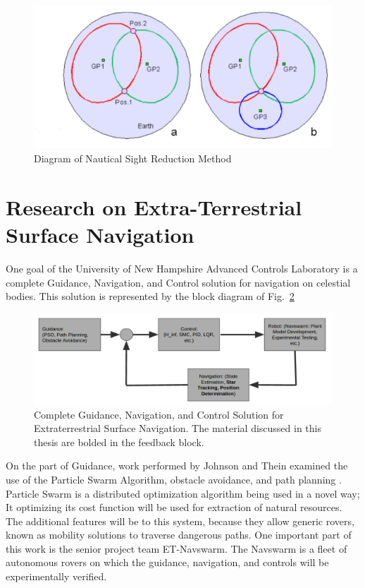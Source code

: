 \documentclass[12pt,a4paper]{book}
\begin{document}
\begin{figure}[h!]
\centering
\includegraphics[scale=0.35]{circles.png}
\caption{Diagram of Nautical Sight Reduction Method \cite{b:celnavde}}
\label{f:circles}
\end{figure}
\section{Research on Extra-Terrestrial Surface Navigation}
One goal of the University of New Hampshire Advanced Controls Laboratory is a complete Guidance, Navigation, and Control solution for navigation on celestial bodies. This solution is represented by the block diagram of Fig.~\ref{f:blocks}
\begin{figure}[h!]
\centering
\includegraphics[scale=0.35]{blocks.png}
\caption{Complete Guidance, Navigation, and Control Solution for Extraterrestrial Surface Navigation.  The material discussed in this thesis are bolded in the feedback block. \cite{b:fuller}}
\label{f:blocks}
\end{figure}
On the part of Guidance, work performed by Johnson and Thein examined the use of the Particle Swarm Algorithm, obstacle avoidance, and path planning \cite{b:johnson}.  Particle Swarm is a distributed optimization algorithm being used in a novel way; It optimizing its cost function will be used for extraction of natural resources.  The additional features will be to this system, because they allow generic rovers, known as mobility solutions to traverse dangerous paths. One important part of this work is the senior project team ET-Navswarm.  The Navswarm is a fleet of autonomous rovers on which the guidance, navigation, and controls will be experimentally verified.
\end{document}
